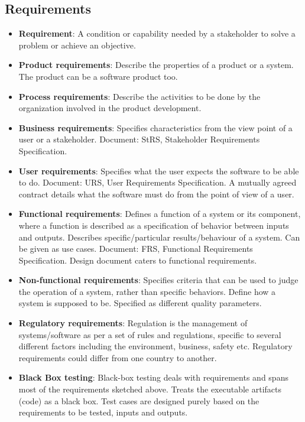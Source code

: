 \documentclass[a4paper]{article}
\begin{document}
\subsection{Requirements}
\begin{itemize}
    \item \textbf{Requirement}: A condition or capability needed by a stakeholder to solve a problem or achieve an objective.
    \item \textbf{Product requirements}: Describe the properties of a product or a system. The product can be a software product too.
    \item \textbf{Process requirements}: Describe the activities to be done by the organization involved in the product development.
    \item \textbf{Business requirements}: Specifies characteristics from the view point of a user or a stakeholder. Document: StRS, Stakeholder Requirements Specification.
    \item \textbf{User requirements}: Specifies what the user expects the software to be able to do. Document: URS, User Requirements Specification. A mutually agreed contract details what the software must do from the point of view of a user.
    \item \textbf{Functional requirements}: Defines a function of a system or its component, where a function is described as a specification of behavior between inputs and outputs. Describes specific/particular results/behaviour of a system. Can be given as use cases. Document: FRS, Functional Requirements Specification. Design document caters to functional requirements.
    \item \textbf{Non-functional requirements}: Specifies criteria that can be used to judge the operation of a system, rather than specific behaviors. Define how a system is supposed to be. Specified as different quality parameters.
    \item \textbf{Regulatory requirements}: Regulation is the management of systems/software as per a set of rules and regulations, specific to several different factors including the environment, business, safety etc. Regulatory requirements could differ from one country to another.
    \item \textbf{Black Box testing}: Black-box testing deals with requirements and spans most of the requirements sketched above. Treats the executable artifacts (code) as a black box. Test cases are designed purely based on the requirements to be tested, inputs and outputs.
\end{itemize}
\end{document}
